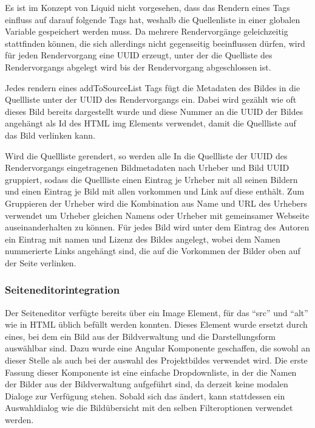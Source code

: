 Es ist im Konzept von Liquid nicht vorgesehen, dass das Rendern eines Tags
einfluss auf darauf folgende Tags hat, weshalb die Quellenliste in einer
globalen Variable gespeichert werden muss. Da mehrere Rendervorgänge
geleichzeitig stattfinden können, die sich allerdings nicht gegenseitig
beeinflussen dürfen, wird für jeden Rendervorgang eine UUID erzeugt, unter der
die Quelliste des Rendervorgangs abgelegt wird bis der Rendervorgang
abgeschlossen ist.

Jedes rendern eines addToSourceList Tags fügt die Metadaten des Bildes in
die Quellliste unter der UUID des Rendervorgangs ein. Dabei wird gezählt wie oft
dieses Bild bereits dargestellt wurde und diese Nummer an die UUID der Bildes
angehängt als Id des HTML img Elements verwendet, damit die Quellliste auf das
Bild verlinken kann.

Wird die Quellliste gerendert, so werden alle In die Quellliste der UUID des
Rendervorgangs eingetragenen Bildmetadaten nach Urheber und Bild UUID gruppiert,
sodass die Quellliste einen Eintrag je Urheber mit all seinen Bildern und einen
Eintrag je Bild mit allen vorkommen und Link auf diese enthält. Zum Gruppieren
der Urheber wird die Kombination aus Name und URL des Urhebers verwendet um
Urheber gleichen Namens oder Urheber mit gemeinsamer Webseite auseinanderhalten
zu können. Für jedes Bild wird unter dem Eintrag des Autoren ein Eintrag mit
namen und Lizenz des Bildes angelegt, wobei dem Namen nummerierte Links
angehängt sind, die auf die Vorkommen der Bilder oben auf der Seite verlinken.

\subsubsection{Seiteneditorintegration}

Der Seiteneditor verfügte bereits über ein Image Element, für das ``src'' und
``alt'' wie in HTML üblich befüllt werden konnten. Dieses Element wurde ersetzt
durch eines, bei dem ein Bild aus der Bildverwaltung und die Darstellungsform
auswählbar sind. Dazu wurde eine Angular Komponente geschaffen, die sowohl an
dieser Stelle als auch bei der auswahl des Projektbildes verwendet wird. Die
erste Fassung dieser Komponente ist eine einfache Dropdownliste, in der die
Namen der Bilder aus der Bildverwaltung aufgeführt sind, da derzeit keine
modalen Dialoge zur Verfügung stehen. Sobald sich das ändert, kann stattdessen
ein Auswahldialog wie die Bildübersicht mit den selben Filteroptionen verwendet
werden.

